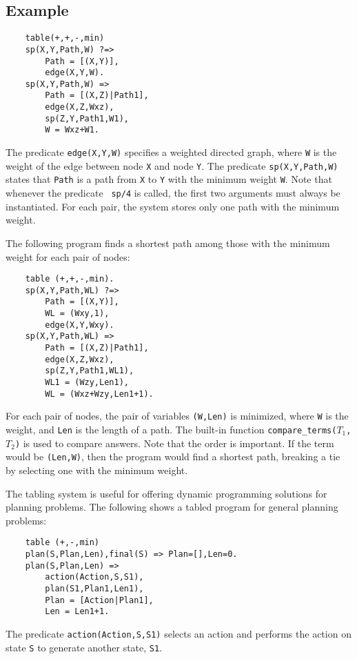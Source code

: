 \subsection*{Example}
\begin{verbatim}
    table(+,+,-,min)
    sp(X,Y,Path,W) ?=>
        Path = [(X,Y)],
        edge(X,Y,W).
    sp(X,Y,Path,W) =>
        Path = [(X,Z)|Path1],
        edge(X,Z,Wxz),
        sp(Z,Y,Path1,W1),
        W = Wxz+W1.
\end{verbatim}
The predicate \texttt{edge(X,Y,W)} specifies a weighted directed graph, where \texttt{W} is the weight of the edge between node \texttt{X} and node \texttt{Y}. The predicate \texttt{sp(X,Y,Path,W)} states that \texttt{Path} is a path from \texttt{X} to \texttt{Y} with the minimum weight \texttt{W}. Note that whenever the predicate \texttt{ sp/4} is called, the first two arguments must always be instantiated. For each pair, the system stores only one path with the minimum weight. 

The following program finds a shortest path among those with the minimum weight for each pair of nodes:
\begin{verbatim}
    table (+,+,-,min).
    sp(X,Y,Path,WL) ?=>
        Path = [(X,Y)],
        WL = (Wxy,1),
        edge(X,Y,Wxy).
    sp(X,Y,Path,WL) =>
        Path = [(X,Z)|Path1],
        edge(X,Z,Wxz),
        sp(Z,Y,Path1,WL1),
        WL1 = (Wzy,Len1),
        WL = (Wxz+Wzy,Len1+1).
\end{verbatim}
For each pair of nodes, the pair of variables \texttt{(W,Len)} is minimized, where \texttt{W} is the weight, and \texttt{Len} is the length of a path. The built-in function \texttt{compare\_terms($T_1$,$T_2$)} is used to compare answers. Note that the order is important. If the term would be \texttt{(Len,W)}, then the program would find a shortest path, breaking a tie by selecting one with the minimum weight.

The tabling system is useful for offering dynamic programming solutions for planning problems. The following shows a tabled program for general planning problems:
\begin{verbatim}
    table (+,-,min)
    plan(S,Plan,Len),final(S) => Plan=[],Len=0.
    plan(S,Plan,Len) =>
        action(Action,S,S1),
        plan(S1,Plan1,Len1),
        Plan = [Action|Plan1],
        Len = Len1+1.
\end{verbatim}
The predicate \texttt{action(Action,S,S1)} selects an action and performs the action on state \texttt{S} to generate another state, \texttt{S1}.

